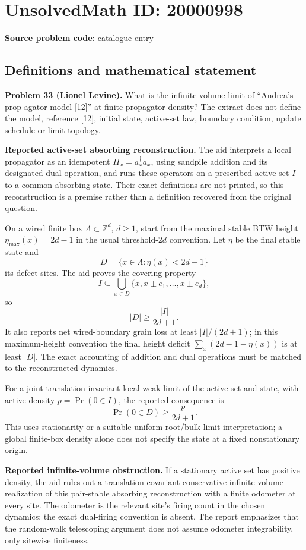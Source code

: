 \documentclass[11pt]{article}
\newcommand{\Z}{\mathbb{Z}}
\begin{document}
\section*{UnsolvedMath ID: 20000998}
\textbf{Source problem code:} catalogue entry
\subsection{Definitions and mathematical statement}
\textbf{Problem 33 (Lionel Levine).} What is the infinite-volume limit of ``Andrea's prop-agator model [12]'' at finite propagator density? The extract does not define the model, reference [12], initial state, active-set law, boundary condition, update schedule or limit topology.

\textbf{Reported active-set absorbing reconstruction.} The aid interprets a local propagator as an idempotent $\Pi_x=a_x^\dagger a_x$, using sandpile addition and its designated dual operation, and runs these operators on a prescribed active set $I$ to a common absorbing state. Their exact definitions are not printed, so this reconstruction is a premise rather than a definition recovered from the original question.

On a wired finite box $\Lambda\subset\Z^d$, $d\geq1$, start from the maximal stable BTW height $\eta_{\max}(x)=2d-1$ in the usual threshold-$2d$ convention. Let $\eta$ be the final stable state and
\[
 D=\{x\in\Lambda:\eta(x)<2d-1\}
\]
its defect sites. The aid proves the covering property
\[
 I\subseteq\bigcup_{x\in D}\{x,x\pm e_1,\ldots,x\pm e_d\},
\]
so
\[
 |D|\geq\frac{|I|}{2d+1}.
\]
It also reports net wired-boundary grain loss at least $|I|/(2d+1)$; in this maximum-height convention the final height deficit $\sum_x(2d-1-\eta(x))$ is at least $|D|$. The exact accounting of addition and dual operations must be matched to the reconstructed dynamics.

For a joint translation-invariant local weak limit of the active set and state, with active density $p=\Pr(0\in I)$, the reported consequence is
\[
 \Pr(0\in D)\geq\frac p{2d+1}.
\]
This uses stationarity or a suitable uniform-root/bulk-limit interpretation; a global finite-box density alone does not specify the state at a fixed nonstationary origin.

\textbf{Reported infinite-volume obstruction.} If a stationary active set has positive density, the aid rules out a translation-covariant conservative infinite-volume realization of this pair-stable absorbing reconstruction with a finite odometer at every site. The odometer is the relevant site's firing count in the chosen dynamics; the exact dual-firing convention is absent. The report emphasizes that the random-walk telescoping argument does not assume odometer integrability, only sitewise finiteness.
\end{document}
